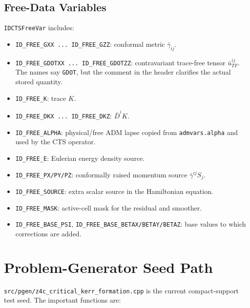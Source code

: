 \documentclass[11pt]{article}
\newcommand{\file}[1]{\nolinkurl{#1}}
\newcommand{\code}[1]{\texttt{#1}}
\begin{document}
\subsection{Free-Data Variables}

\code{IDCTSFreeVar} includes:
\begin{itemize}
  \item \code{ID\_FREE\_GXX ... ID\_FREE\_GZZ}: conformal metric
        \(\bar{\gamma}_{ij}\).
  \item \code{ID\_FREE\_GDOTXX ... ID\_FREE\_GDOTZZ}: contravariant trace-free
        tensor \(\bar{u}^{ij}_{TF}\).  The names say \code{GDOT}, but the comment
        in the header clarifies the actual stored quantity.
  \item \code{ID\_FREE\_K}: trace \(K\).
  \item \code{ID\_FREE\_DKX ... ID\_FREE\_DKZ}: \(\bar{D}^i K\).
  \item \code{ID\_FREE\_ALPHA}: physical/free ADM lapse copied from
        \code{admvars.alpha} and used by the CTS operator.
  \item \code{ID\_FREE\_E}: Eulerian energy density source.
  \item \code{ID\_FREE\_PX/PY/PZ}: conformally raised momentum source
        \(\bar{\gamma}^{ij}S_j\).
  \item \code{ID\_FREE\_SOURCE}: extra scalar source in the Hamiltonian equation.
  \item \code{ID\_FREE\_MASK}: active-cell mask for the residual and smoother.
  \item \code{ID\_FREE\_BASE\_PSI}, \code{ID\_FREE\_BASE\_BETAX/BETAY/BETAZ}:
        base values to which corrections are added.
\end{itemize}

\section{Problem-Generator Seed Path}

\file{src/pgen/z4c\_critical\_kerr\_formation.cpp} is the current compact-support
test seed.  The important functions are:
\end{document}
